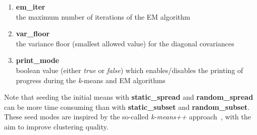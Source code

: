 \begin{small}
\begin{itemize}
\begin{enumerate}[{$\cdot$}]
\item
{\bf em\_iter}\\
the maximum number of iterations of the EM algorithm

\item
{\bf var\_floor}\\
the variance floor (smallest allowed value) for the diagonal covariances

\item
{\bf print\_mode}\\
boolean value (either {\it true} or {\it false}) which enables/disables the printing of progress during the {\it k}-means and EM algorithms 

\end{enumerate}

Note that seeding the initial means with {\bf static\_spread} and {\bf random\_spread}
can be more time consuming than with {\bf static\_subset} and {\bf random\_subset}.
These seed modes are inspired by the so-called {\it k-means++} approach~\cite{Arthur_2007}, with the aim to improve clustering quality.

\end{itemize}
\end{small}



